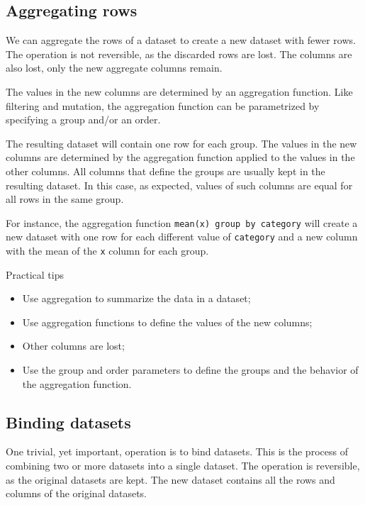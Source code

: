 \subsection{Aggregating rows}

We can aggregate the rows of a dataset to create a new dataset with fewer rows.    The
operation is not reversible, as the discarded rows are lost.  The columns are also lost,
only the new aggregate columns remain.

The values in the new columns are determined by an aggregation function.  Like filtering
and mutation, the aggregation function can be parametrized by specifying a group and/or an
order.

The resulting dataset will contain one row for each group.  The values in the new columns
are determined by the aggregation function applied to the values in the other columns.
All columns that define the groups are usually kept in the resulting dataset.  In this
case, as expected, values of such columns are equal for all rows in the same group.

For instance, the aggregation function \texttt{mean(x) group by category} will create a
new dataset with one row for each different value of \texttt{category} and a new column
with the mean of the \texttt{x} column for each group.

\begin{hlbox}{Practical tips}
  \begin{itemize}
    \item Use aggregation to summarize the data in a dataset;
    \item Use aggregation functions to define the values of the new columns;
    \item Other columns are lost;
    \item Use the group and order parameters to define the groups and the behavior of the
      aggregation function.
  \end{itemize}
\end{hlbox}

\subsection{Binding datasets}

One trivial, yet important, operation is to bind datasets.  This is the process of
combining two or more datasets into a single dataset.  The operation is reversible, as the
original datasets are kept.  The new dataset contains all the rows and columns of the
original datasets.

